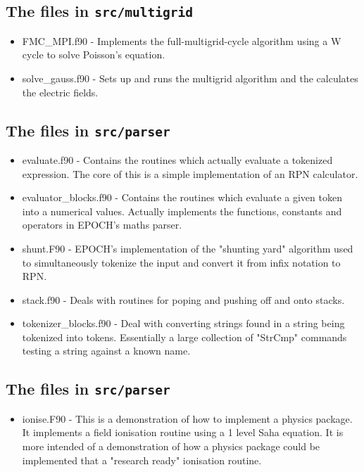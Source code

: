 \documentclass[12pt,a4paper]{article}
\newcommand{\inlinecode}[1]{{\color{warwickred} \bf\texttt{#1}}}
\begin{document}
\subsection{The files in \inlinecode{src/multigrid}}
\begin{itemize}
\item FMC\_MPI.f90 - Implements the full-multigrid-cycle algorithm using a W
  cycle to solve Poisson's equation.
\item solve\_gauss.f90 - Sets up and runs the multigrid algorithm and the
  calculates the electric fields.
\end{itemize}

\subsection{The files in \inlinecode{src/parser}}
\begin{itemize}
\item evaluate.f90 - Contains the routines which actually evaluate a tokenized
  expression. The core of this is a simple implementation of an RPN
  calculator.
\item evaluator\_blocks.f90 - Contains the routines which evaluate a given
  token into a numerical values. Actually implements the functions, constants
  and operators in EPOCH's maths parser.
\item shunt.F90 - EPOCH's implementation of the "shunting yard" algorithm used
  to simultaneously tokenize the input and convert it from infix notation to
  RPN.
\item stack.f90 - Deals with routines for poping and pushing off and onto
  stacks.
\item tokenizer\_blocks.f90 - Deal with converting strings found in a string
  being tokenized into tokens. Essentially a large collection of "StrCmp"
  commands testing a string against a known name.
\end{itemize}

\subsection{The files in \inlinecode{src/parser}}
\begin{itemize}
\item ionise.F90 - This is a demonstration of how to implement a physics
  package. It implements a field ionisation routine using a 1 level Saha
  equation. It is more intended of a demonstration of how a physics package
  could be implemented that a "research ready" ionisation routine.
\end{itemize}
\end{document}
